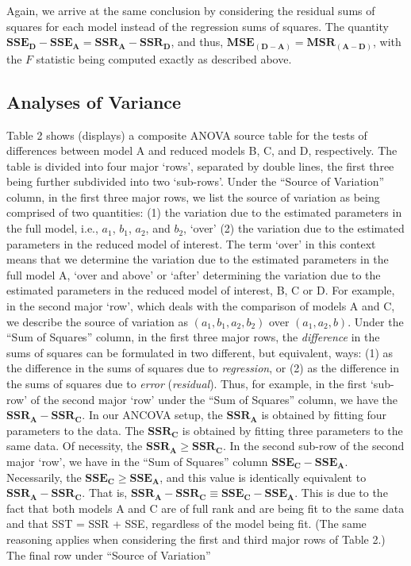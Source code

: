 \documentclass[11pt, oneside]{article}   	%
\begin{document}
\vspace{2 mm}

Again, we arrive at the same conclusion by considering the residual sums of squares for each model instead of the regression sums of squares.  The quantity $ \mathbf{ SSE_{D}} - \mathbf{SSE_{A} }  =   \mathbf{SSR_{A}} -  \mathbf{SSR_{D}}  $, and thus, $ \mathbf{ MSE_{(D-A)}}   =  \mathbf{MSR_{(A-D)}} $, with the $  F  $ statistic being computed exactly as described above.
\bigskip
  

\bigskip 

\subsection{Analyses of Variance}
Table 2 shows (displays) a composite ANOVA source table for the tests of differences between model A and reduced models B, C, and D, respectively.  The table is divided into four major `rows', separated by double lines, the first three being further subdivided into two `sub-rows'.  Under the ``Source of Variation'' column, in the first three major rows, we list the source of variation as being comprised of two quantities: (1) the variation due to the estimated parameters in the full model, i.e., $ a_{1} $, $ b_{1}  $, $  a_{2} $, and $  b_{2} $, `over' (2) the variation due to the estimated parameters in the reduced model of interest.  The term `over' in this context means that we determine the variation due to the estimated parameters in the full model A, `over and above' or `after' determining the variation due to the estimated parameters in the reduced model of interest, B, C or D.  For example, in the second major `row', which deals with the comparison of models A and C, we describe the source of variation as $ (a_{1}, b_{1}, a_{2}, b_{2})  $ over $  (a_{1}, a_{2}, b)  $.  Under the ``Sum of Squares'' column, in the first three major rows, the \emph{difference} in the sums of squares can be formulated in two different, but equivalent, ways: (1) as the difference in the sums of squares due to \emph{regression}, or (2) as the difference in the sums of squares due to \emph{error} (\emph{residual}).  Thus, for example, in the first `sub-row' of the second major `row' under the ``Sum of Squares'' column, we have the $ \mathbf{SSR_{A}} - \mathbf{SSR_{C}}  $. In our ANCOVA setup, the $ \mathbf{SSR_{A}}  $ is obtained by fitting four parameters to the data.  The  $ \mathbf{SSR_{C}}  $ is obtained by fitting three parameters to the same data.  Of necessity, the  $ \mathbf{SSR_{A}} \geq \mathbf{SSR_{C}}  $.   In the second sub-row of the second major `row', we have in the ``Sum of Squares'' column $ \mathbf{SSE_{C}} - \mathbf{SSE_{A}}  $.  Necessarily, the  $ \mathbf{SSE_{C}} \geq \mathbf{SSE_{A}}  $, and this value is identically equivalent to $ \mathbf{SSR_{A}} - \mathbf{SSR_{C}}  $. That is, $ \mathbf{SSR_{A}} - \mathbf{SSR_{C}}  \equiv  \mathbf{SSE_{C}} - \mathbf{SSE_{A}}  $.  This is due to the fact that both models A and C are of full rank and are being fit to the same data and that SST = SSR + SSE, regardless of the model being fit.  (The same reasoning applies when considering the first and third major rows of Table 2.)   The final row under ``Source of Variation'' 
\end{document}
